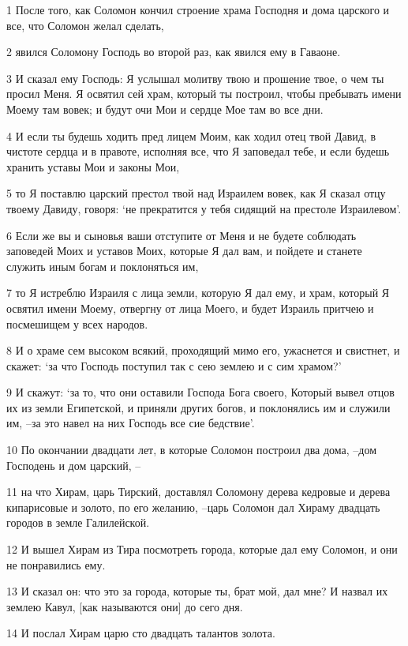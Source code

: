 \par 1 После того, как Соломон кончил строение храма Господня и дома царского и все, что Соломон желал сделать,
\par 2 явился Соломону Господь во второй раз, как явился ему в Гаваоне.
\par 3 И сказал ему Господь: Я услышал молитву твою и прошение твое, о чем ты просил Меня. Я освятил сей храм, который ты построил, чтобы пребывать имени Моему там вовек; и будут очи Мои и сердце Мое там во все дни.
\par 4 И если ты будешь ходить пред лицем Моим, как ходил отец твой Давид, в чистоте сердца и в правоте, исполняя все, что Я заповедал тебе, и если будешь хранить уставы Мои и законы Мои,
\par 5 то Я поставлю царский престол твой над Израилем вовек, как Я сказал отцу твоему Давиду, говоря: `не прекратится у тебя сидящий на престоле Израилевом'.
\par 6 Если же вы и сыновья ваши отступите от Меня и не будете соблюдать заповедей Моих и уставов Моих, которые Я дал вам, и пойдете и станете служить иным богам и поклоняться им,
\par 7 то Я истреблю Израиля с лица земли, которую Я дал ему, и храм, который Я освятил имени Моему, отвергну от лица Моего, и будет Израиль притчею и посмешищем у всех народов.
\par 8 И о храме сем высоком всякий, проходящий мимо его, ужаснется и свистнет, и скажет: `за что Господь поступил так с сею землею и с сим храмом?'
\par 9 И скажут: `за то, что они оставили Господа Бога своего, Который вывел отцов их из земли Египетской, и приняли других богов, и поклонялись им и служили им, --за это навел на них Господь все сие бедствие'.
\par 10 По окончании двадцати лет, в которые Соломон построил два дома, --дом Господень и дом царский, --
\par 11 на что Хирам, царь Тирский, доставлял Соломону дерева кедровые и дерева кипарисовые и золото, по его желанию, --царь Соломон дал Хираму двадцать городов в земле Галилейской.
\par 12 И вышел Хирам из Тира посмотреть города, которые дал ему Соломон, и они не понравились ему.
\par 13 И сказал он: что это за города, которые ты, брат мой, дал мне? И назвал их землею Кавул, [как называются они] до сего дня.
\par 14 И послал Хирам царю сто двадцать талантов золота.
